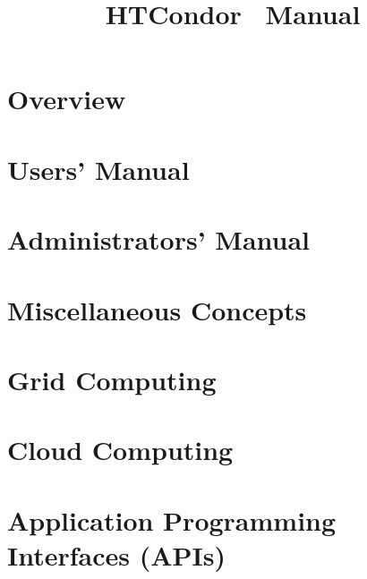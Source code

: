 \documentclass[titlepage,oneside,bookmarks,bookmarksnumbered,plainpages=false,pdfpagelabels]{book}
\begin{document}

\title{HTCondor\textsuperscript{\small{\texttrademark}} \VersionNotice\ Manual}
\author{\AuthorNotice}
\maketitle


\tableofcontents

\sloppy

\begin{small}

\end{small}

\newpage
{}

\chapter{Overview}
\label{overview}


\chapter{Users' Manual}
\label{user-manual}


\chapter{Administrators' Manual}
\label{admin-manual}


\chapter{Miscellaneous Concepts}
\label{misc-concepts}


\chapter{Grid Computing}
\label{grid-computing}


\chapter{Cloud Computing}
\label{cloud-computing}


\chapter{Application Programming Interfaces (APIs)}
\label{APIs}

\end{document}
